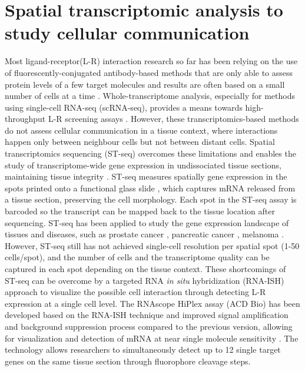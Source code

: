 \section{Spatial transcriptomic analysis to study cellular communication}
\label{Sec:2.1_intro}	%
Most ligand-receptor(L-R) interaction research so far has been relying on the use of fluorescently-conjugated antibody-based methods that are only able to assess protein levels of a few target molecules and results are often based on a small number of cells at a time \cite{moses2022museum, lewis2021spatial}. Whole-transcriptome analysis, especially for methods using single-cell RNA-seq (scRNA-seq), provides a means towards high-throughput L-R screening assays \cite{browaeys2020nichenet, efremova2020cellphonedb}. However, these transcriptomics-based methods do not assess cellular communication in a tissue context, where interactions happen only between neighbour cells but not between distant cells. Spatial transcriptomics sequencing (ST-seq) overcomes these limitations and enables the study of transcriptome-wide gene expression in undissociated tissue sections, maintaining tissue integrity \cite{salmen2018barcoded}. ST-seq measures spatially  gene expression in the spots printed onto a functional glass slide \cite{salmen2018barcoded}, which captures mRNA released from a tissue section, preserving the cell morphology. Each spot in the ST-seq assay is barcoded so the transcript can be mapped back to the tissue location after sequencing. ST-seq has been applied to study the gene expression landscape of tissues and diseases, such as prostate cancer \cite{berglund2018spatial, ji2020multimodal}, pancreatic cancer \cite{moncada2019integrating}, melanoma \cite{thrane2018spatially}. However, ST-seq still has not achieved single-cell resolution per spatial spot (1-50 cells/spot), and the number of cells and the transcriptome quality can be captured in each spot depending on the tissue context. These shortcomings of ST-seq can be overcome by a targeted RNA \textit{in situ} hybridization (RNA-ISH) approach to visualize the possible cell interaction through detecting L-R expression at a single cell level. The RNAscope HiPlex assay (ACD Bio) has been developed based on the RNA-ISH technique and improved signal amplification and background suppression process compared to the previous version, allowing for visualization and detection of mRNA at near single molecule sensitivity \cite{wang2012rnascope,schulz2018simultaneous}. The technology allows researchers to simultaneously detect up to 12 single target genes on the same tissue section through fluorophore cleavage steps.  


